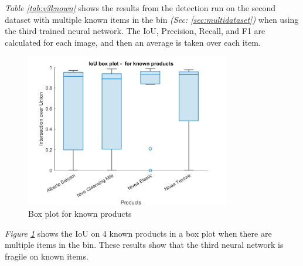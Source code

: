 \begin{table}[h]
\caption{Detection results when tested on trained data using the third neural network}
\label{tab:v3known}
\end{table}
\textit{Table \ref{tab:v3known}} shows the results from the detection run on the second dataset with multiple known items in the bin \textit{(Sec: \ref{sec:multidataset})} when using the third trained neural network. The IoU, Precision, Recall, and F1 are calculated for each image, and then an average is taken over each item. 

\begin{figure}[h]
    \centering
    \includegraphics[width=0.8\textwidth]{graphics/results/v3boxplotForKnownProducts.png}
    \caption{Box plot for known products}
    \label{fig:v3boxknownproducts}
\end{figure}
\textit{Figure \ref{fig:v3boxknownproducts}} shows the IoU on 4 known products in a box plot when there are multiple items in the bin.  These results show that the third neural network is fragile on known items.

